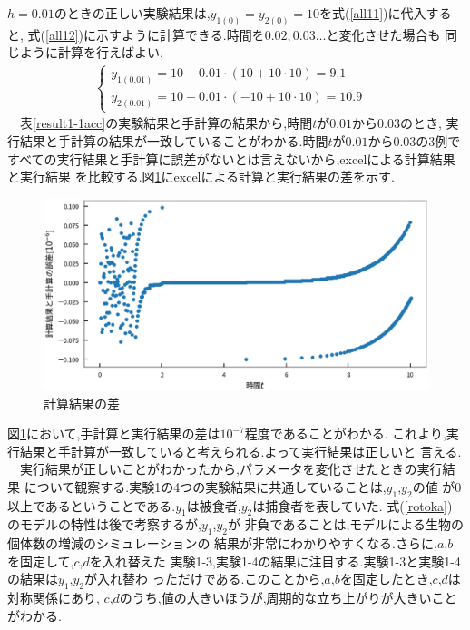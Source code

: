 \documentclass[a4j]{jarticle}
\begin{document}
      $h=0.01$のときの正しい実験結果は,$y_{1(0)}=y_{2(0)}=10$を式(\ref{all11})に代入すると,
      式(\ref{all12})に示すように計算できる.時間を$0.02,0.03 \dots $と変化させた場合も
      同じように計算を行えばよい.
      \begin{eqnarray}
        \begin{cases}
          y_{1(0.01)} = 10+0.01\cdot (10 + 10\cdot 10) = 9.1& \\
          y_{2(0.01)} = 10+0.01\cdot (-10 + 10\cdot 10) = 10.9&
        \end{cases}
        \label{all12}
      \end{eqnarray}
      　表\ref{result1-1acc}の実験結果と手計算の結果から,時間$t$が$0.01$から$0.03$のとき,
      実行結果と手計算の結果が一致していることがわかる.時間$t$が$0.01$から$0.03$の3例で
      すべての実行結果と手計算に誤差がないとは言えないから,excelによる計算結果と実行結果
      を比較する.図\ref{gosa}にexcelによる計算と実行結果の差を示す.
      \begin{figure}[H]
        \centering
        \includegraphics[scale=0.5]{ex11error.eps}
        \caption{計算結果の差}
         \label{gosa}
        \end{figure}
        
        図\ref{gosa}において,手計算と実行結果の差は$10^{-7}$程度であることがわかる.
        これより,実行結果と手計算が一致していると考えられる.よって実行結果は正しいと
        言える.\\
        　実行結果が正しいことがわかったから,パラメータを変化させたときの実行結果
        について観察する.実験1の4つの実験結果に共通していることは,$y_1$,$y_2$の値
        が0以上であるということである.$y_1$は被食者,$y_2$は捕食者を表していた.
        式(\ref{rotoka})のモデルの特性は後で考察するが,$y_1$,$y_2$が
        非負であることは,モデルによる生物の個体数の増減のシミュレーションの
        結果が非常にわかりやすくなる.さらに,$a$,$b$を固定して,$c$,$d$を入れ替えた
        実験1-3,実験1-4の結果に注目する.実験1-3と実験1-4の結果は$y_1$,$y_2$が入れ替わ
        っただけである.このことから,$a$,$b$を固定したとき,$c$,$d$は対称関係にあり,
        $c$,$d$のうち,値の大きいほうが,周期的な立ち上がりが大きいことがわかる.
      
\end{document}
